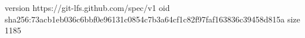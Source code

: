 version https://git-lfs.github.com/spec/v1
oid sha256:73acb1eb036c6bbf0e96131c0854c7b3a64cf1c82f97faf163836c39458d815a
size 1185
